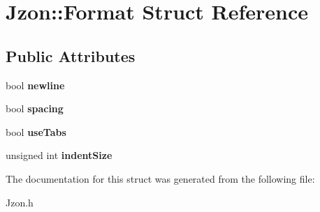 \hypertarget{struct_jzon_1_1_format}{\section{Jzon\-:\-:Format Struct Reference}
\label{struct_jzon_1_1_format}
}
\subsection*{Public Attributes}
\begin{DoxyCompactItemize}
\item 
\hypertarget{struct_jzon_1_1_format_a1c51a7f573ca61f17f9afa6b7e24c42a}{bool {\bfseries newline}}\label{struct_jzon_1_1_format_a1c51a7f573ca61f17f9afa6b7e24c42a}

\item 
\hypertarget{struct_jzon_1_1_format_a161944bdacf4ad60a5a5056ae70f52a5}{bool {\bfseries spacing}}\label{struct_jzon_1_1_format_a161944bdacf4ad60a5a5056ae70f52a5}

\item 
\hypertarget{struct_jzon_1_1_format_a51efdbd4255f12407ccd58218d3c10b9}{bool {\bfseries use\-Tabs}}\label{struct_jzon_1_1_format_a51efdbd4255f12407ccd58218d3c10b9}

\item 
\hypertarget{struct_jzon_1_1_format_ac95efe59857d3329bbda4925b5ad3f18}{unsigned int {\bfseries indent\-Size}}\label{struct_jzon_1_1_format_ac95efe59857d3329bbda4925b5ad3f18}

\end{DoxyCompactItemize}


The documentation for this struct was generated from the following file\-:\begin{DoxyCompactItemize}
\item 
Jzon.\-h\end{DoxyCompactItemize}
